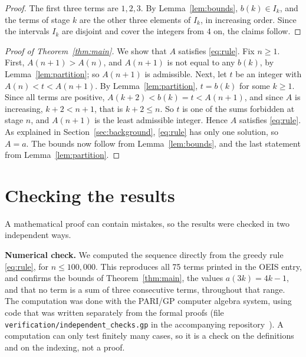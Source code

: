 \documentclass[11pt,a4paper]{article}
\theoremstyle{definition}
\theoremstyle{remark}
\newcommand{\para}[1]{\par\medskip\noindent\textbf{#1}\enspace}
\begin{document}
\begin{proof}
The first three terms are $1,2,3$. By Lemma~\ref{lem:bounds}, $b(k)\in I_k$, and the terms of stage $k$ are the other
three elements of $I_k$, in increasing order. Since the intervals $I_k$ are disjoint and cover the integers from $4$ on,
the claims follow.
\end{proof}

\begin{proof}[Proof of Theorem~\ref{thm:main}]
We show that $A$ satisfies \eqref{eq:rule}. Fix $n\ge1$. First, $A(n+1)>A(n)$, and $A(n+1)$ is not equal to any $b(k)$,
by Lemma~\ref{lem:partition}; so $A(n+1)$ is admissible. Next, let $t$ be an integer with $A(n)<t<A(n+1)$. By
Lemma~\ref{lem:partition}, $t=b(k)$ for some $k\ge1$. Since all terms are positive, $A(k+2)<b(k)=t<A(n+1)$, and since $A$
is increasing, $k+2<n+1$, that is $k+2\le n$. So $t$ is one of the sums forbidden at stage $n$, and $A(n+1)$ is the least
admissible integer. Hence $A$ satisfies \eqref{eq:rule}. As explained in Section~\ref{sec:background}, \eqref{eq:rule}
has only one solution, so $A=a$. The bounds now follow from Lemma~\ref{lem:bounds}, and the last statement from
Lemma~\ref{lem:partition}.
\end{proof}

\section{Checking the results}\label{sec:checks}

A mathematical proof can contain mistakes, so the results were checked in two independent ways.

\para{Numerical check.}
We computed the sequence directly from the greedy rule \eqref{eq:rule}, for $n\le100{,}000$. This reproduces all
75 terms printed in the OEIS entry, and confirms the bounds of Theorem~\ref{thm:main}, the values $a(3k)=4k-1$, and that
no term is a sum of three consecutive terms, throughout that range.
The computation was done with the PARI/GP computer algebra system, using code that was written separately from the
formal proofs (file \texttt{verification/independent\_checks.gp} in the accompanying repository~\cite{repo}).
A computation can only test finitely many cases, so it is a check on the definitions and on the indexing, not a proof.
\end{document}
